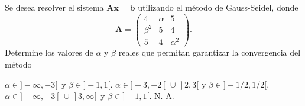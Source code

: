 \begin{pregunta}
\begin{cuerpo}
Se desea resolver el sistema $\boldsymbol{A} \boldsymbol{x} = \boldsymbol{b}$ utilizando el m\'etodo de Gauss-Seidel, donde
\begin{equation*}
\boldsymbol{A} = \begin{pmatrix}
  4          & \alpha & 5 \\
  \beta^2  & 5           &4\\
  5		 &4 		 &\alpha^2
\end{pmatrix}.
\end{equation*}
Determine los valores de $\alpha$ y $\beta$ reales que permitan garantizar la convergencia del m\'etodo
\end{cuerpo}
\begin{alternativas}
{$\alpha \in ]-\infty,-3[ \,$ y $\beta \in ]-1,1[$.} %
{$\alpha \in ]-3,-2[ \,\cup \,]2,3[$ y $\beta \in ]-1/2,1/2[$.} 
{$\alpha \in ]-\infty,-3[\, \cup\, ]3,\infty[ \,$ y $\beta \in ]-1,1[$.} 
{N. A.}
\end{alternativas}
\justificacion{7cm}
\end{pregunta}